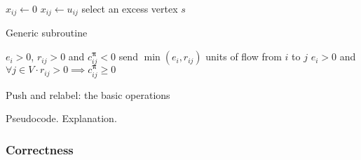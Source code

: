 \begin{algorithm}
    \begin{algorithmic}[1]
             
                 $x_{ij} \gets 0$ \EndIf
                 $x_{ij} \gets u_{ij}$ \EndIf
            \EndFor
             
                \State select an excess vertex $s$
                 
                \Else \enspace{}
                \EndIf
            \EndWhile
        \EndFunction
    \end{algorithmic}
    \caption{Generic  subroutine}
    \label{algo:cost-scaling-generic-refine}
\end{algorithm}

\begin{algorithm}
\begin{algorithmic}[1]
    \Require $e_i > 0$, $r_{ij} > 0$ and $c^{\boldsymbol{\pi}}_{ij} < 0$
        \State send $\min\left(e_i, r_{ij}\right)$ units of flow from $i$ to $j$
    \EndFunction    
    \setcounter{ALG@line}{0}
    \Statex
    \Require $e_i > 0$ and $\forall j \in V\cdot r_{ij} > 0 \implies c^{\boldsymbol{\pi}}_{ij} \geq 0$
    \EndFunction
\end{algorithmic}
\caption{Push and relabel: the basic operations}
\label{algo:cost-scaling-operations}
\end{algorithm}


Pseudocode. Explanation.

\subsubsection{Correctness}

